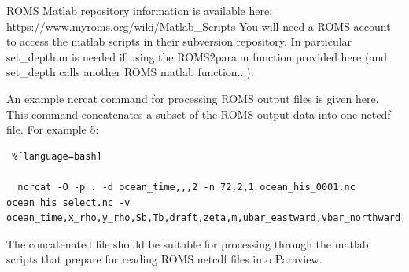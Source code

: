 \documentclass[11pt]{article}
\begin{document}
ROMS Matlab repository information is available here:
https://www.myroms.org/wiki/Matlab\_Scripts
You will need a ROMS account to access the matlab scripts in their subversion repository.
In particular set\_depth.m is needed if using the ROMS2para.m function provided
here (and set\_depth calls another ROMS matlab function...).

An example ncrcat command for processing ROMS output files is given here.
This command concatenates a subset of the ROMS output data into one netcdf file.
For example 5:
\begin{lstlisting} %[language=bash]

  ncrcat -O -p . -d ocean_time,,,2 -n 72,2,1 ocean_his_0001.nc ocean_his_select.nc -v ocean_time,x_rho,y_rho,Sb,Tb,draft,zeta,m,ubar_eastward,vbar_northward,w,u_eastward,v_northward,temp,salt,h,wetdry_mask_rho,Vtransform,Vstretching,theta_s,theta_b,hc

\end{lstlisting}





The concatenated file should be suitable for processing through the matlab scripts
that prepare for reading ROMS netcdf files into Paraview.
\end{document}
